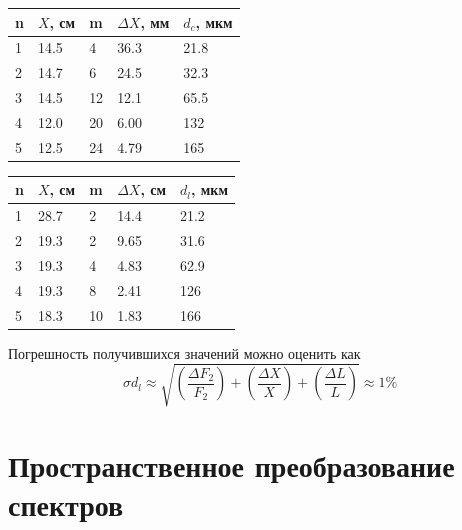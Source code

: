\documentclass[a4paper, 12pt]{article}
\begin{document}
\begin{minipage}{0.5\textwidth}
    \begin{center}
    \begin{tabular}{|l|l|l|l|l|}
    \hline
    n & $X$, см & m  & $\Delta X$, мм & $d_c$, мкм \\ \hline
    1 & 14.5    & 4  & 36.3           & 21.8       \\ 
    2 & 14.7    & 6  & 24.5           & 32.3       \\ 
    3 & 14.5    & 12 & 12.1           & 65.5       \\ 
    4 & 12.0    & 20 & 6.00           & 132        \\ 
    5 & 12.5    & 24 & 4.79           & 165        \\ \hline
    \end{tabular}
    \label{table::no_lenses}
    \end{center}
\end{minipage}
\begin{minipage}{0.5\textwidth}
    \begin{center}
    \begin{tabular}{|l|l|l|l|l|}
    \hline
    n & $X$, см & m  & $\Delta X$, см & $d_l$, мкм \\ \hline
    1 & 28.7    & 2  & 14.4           & 21.2       \\
    2 & 19.3    & 2  & 9.65           & 31.6       \\
    3 & 19.3    & 4  & 4.83           & 62.9       \\
    4 & 19.3    & 8  & 2.41           & 126        \\
    5 & 18.3    & 10 & 1.83           & 166        \\ \hline
    \end{tabular}
    \label{table::with_lenses}
    \end{center}
\end{minipage}
$$$$
Погрешность получившихся значений можно оценить как 
$$\sigma d_l \approx \sqrt{\left(\frac{\Delta F_2}{F_2}\right) + \left(\frac{\Delta X}{X}\right) + \left(\frac{\Delta L}{L}\right)} \approx 1\%$$

\section*{Пространственное преобразование спектров}
\end{document}
